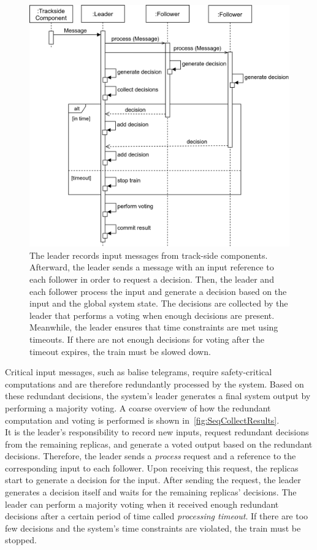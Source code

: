 \begin{figure}[!hb]
	\centering
	\includegraphics[width=0.8\linewidth]{images/sequence/CollectResults}
	\caption{The leader records input messages from track-side components. Afterward, the leader sends a message with an input reference to each follower in order to request a decision. Then, the leader and each follower process the input and generate a decision based on the input and the global system state. The decisions are collected by the leader that performs a voting when enough decisions are present. Meanwhile, the leader ensures that time constraints are met using timeouts. If there are not enough decisions for voting after the timeout expires, the train must be slowed down.}
	\label{fig:SeqCollectResults}
\end{figure}

Critical input messages, such as balise telegrams, require safety-critical computations and are therefore redundantly processed by the system.
Based on these redundant decisions, the system's leader generates a final system output by performing a majority voting.
A coarse overview of how the redundant computation and voting is performed is shown in~\autoref{fig:SeqCollectResults}.
\\

It is the leader's responsibility to record new inputs, request redundant decisions from the remaining replicas, and generate a voted output based on the redundant decisions.
Therefore, the leader sends a \textit{process} request and a reference to the corresponding input to each follower.
Upon receiving this request, the replicas start to generate a decision for the input.
After sending the request, the leader generates a decision itself and waits for the remaining replicas' decisions.
The leader can perform a majority voting when it received enough redundant decisions after a certain period of time called \textit{processing timeout}.
If there are too few decisions and the system's time constraints are violated, the train must be stopped.
\\

